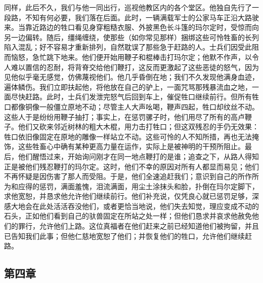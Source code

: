 同样，此后不久，我们与他一同出行，巡视他教区内的各个堂区。他独自先行了一段路，不知有何必要，我们落在后面。此时，一辆满载军士的公家马车正沿大路驶来。当靠近路边的牲口看见身穿粗糙衣服、外披黑色长斗篷的玛尔定时，受惊而向另一边偏转。随后，缰绳缠绕，使那些（如你常见那样）捆绑这些可怜牲畜的长列陷入混乱；好不容易才重新排列，自然耽误了那些急于赶路的人。士兵们因受此阻而恼怒，急忙跳下地来。他们便开始用鞭子和棍棒击打玛尔定；他默不作声，以令人难以置信的忍耐，将背脊交给他们鞭打，这反而更激起了这些恶徒的怒气，因为见他似乎毫无感觉，仿佛蔑视他们。他几乎昏倒在地；我们不久发现他满身血迹，遍体鳞伤。我们立即扶起他，将他放在自己的驴上，一面咒骂那残暴流血之地，一面尽快赶路。此时，士兵们发泄完怒气后回到车上，催促牲口继续前行。但所有牲口都像铜像一般僵立原地不动；尽管主人大声吆喝，鞭声四起，牲口却纹丝不动。这些人于是纷纷用鞭子抽打；事实上，在惩罚骡子时，他们用尽了所有的高卢鞭子。他们又砍来邻近树林的粗大木棍，用力击打牲口；但这双残忍的手仍无效果：牲口依旧像固定在原地的雕像一样站立不动。这些可怜的人不知所措，再也无法掩饰，这些牲畜心中确有某种更高力量在运作，实际上是被神明的干预所阻止。最后，他们醒悟过来，开始询问刚才在同一地点鞭打的是谁；追查之下，从路人得知正是被他们残忍鞭打的玛尔定。这时，他们不幸的原因对所有人都显而易见；他们不再怀疑是因伤害了那人而受阻。于是，他们全速追赶我们；意识到自己的所作所为和应得的惩罚，满面羞愧，泪流满面，用尘土涂抹头和脸，扑倒在玛尔定脚下，求他宽恕，并恳求他允许他们继续前行。他们补充说，仅凭良心就已惩罚足够，深感大地会在此处活活吞没他们，或者更恰当地说，他们失去知觉，理应变成不动的石头，正如他们看到自己的驮兽固定在所站之处一样；但他们恳求并哀求他赦免他们的罪行，允许他们上路。这位真福者在他们赶来之前已经知道他们被拘留，并且已告知我们此事；但他仁慈地宽恕了他们；并恢复他们的牲口，允许他们继续赶路。\par


\subsection{第四章}

